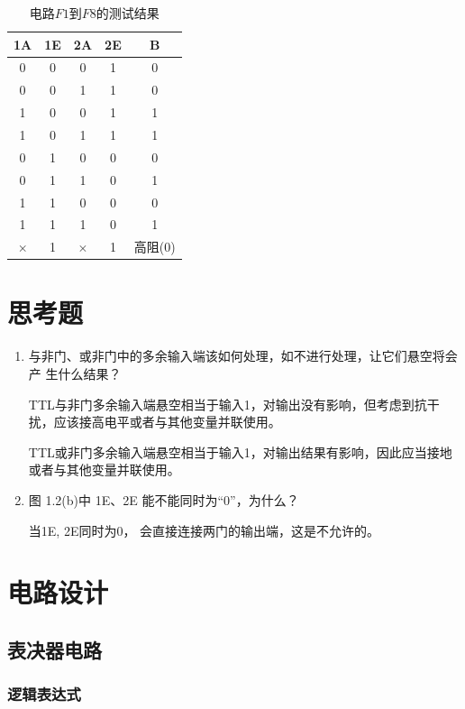 \documentclass[a4paper,twoside]{ctexart}
\begin{document}
\begin{spacing}{1.2}
\begin{table}[htbp]
	\centering
	\caption{电路$F1$到$F8$的测试结果}
	\label{tbl:bus}
	\begin{tabular}{cccc|c}
		\toprule
		\hline
		1A&1E&2A&2E&B\\
		\hline
		0&0&0&1&0\\
		0&0&1&1&0\\
		1&0&0&1&1\\
		1&0&1&1&1\\
		0&1&0&0&0\\
		0&1&1&0&1\\
		1&1&0&0&0\\
		1&1&1&0&1\\
		\hline
		$\times$&1&$\times$&1&高阻(0)\\
		\hline
		\bottomrule
	\end{tabular}
\end{table}

\section{思考题}

\begin{enumerate}
	\item 与非门、或非门中的多余输入端该如何处理，如不进行处理，让它们悬空将会产
	生什么结果？

	TTL与非门多余输入端悬空相当于输入1，对输出没有影响，但考虑到抗干扰，应该接高电平或者与其他变量并联使用。
	
	TTL或非门多余输入端悬空相当于输入1，对输出结果有影响，因此应当接地或者与其他变量并联使用。

	\item 图 1.2(b)中 1E、2E 能不能同时为“0”，为什么？
	
	当1E, 2E同时为0， 会直接连接两门的输出端，这是不允许的。
\end{enumerate}

\clearpage


\setcounter{section}{4}

\section{电路设计}

\subsection{表决器电路}

\subsubsection{逻辑表达式}


\end{spacing}
\end{document}
